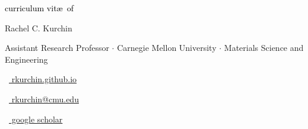 \begin{scriptsize}
	 \textcolor{black}{curriculum vit\ae~of}
\end{scriptsize}

\vspace*{-0.10em}
\begin{Large} 
	Rachel C. Kurchin
\end{Large}

\vspace*{0.25em}
\begin{scshape}
	\begin{footnotesize}
		  \textcolor{highlight2}{Assistant Research Professor $\cdot$ Carnegie Mellon University $\cdot$ Materials Science and Engineering}
		  
	\end{footnotesize}
\end{scshape}
\vspace*{0.1cm}

\begin{footnotesize}
	\begin{tiny}\faHome\end{tiny}~\href{https://rkurchin.github.io}{
		rkurchin.github.io
	}
	\quad \begin{tiny}\faEnvelope[regular]\end{tiny}~\href{mailto:rkurchin@cmu.edu}{%
		rkurchin@cmu.edu
	} 	
	\quad \begin{tiny}\faGraduationCap\end{tiny}~\href{https://scholar.google.com/citations?user=rkurchin&hl=en}{
		 google scholar
		}

\end{footnotesize}
